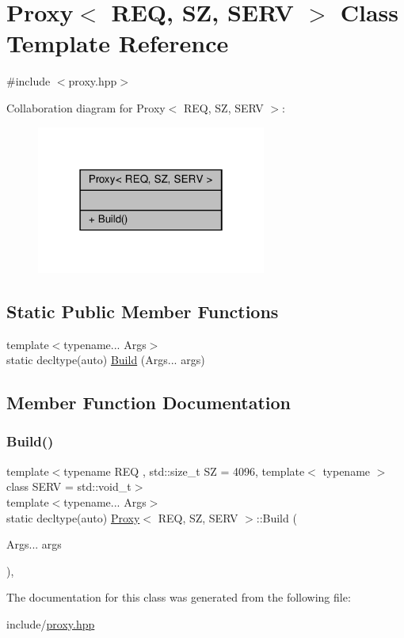 \hypertarget{classProxy}{}\section{Proxy$<$ R\+EQ, SZ, S\+E\+RV $>$ Class Template Reference}
\label{classProxy}


{\ttfamily \#include $<$proxy.\+hpp$>$}



Collaboration diagram for Proxy$<$ R\+EQ, SZ, S\+E\+RV $>$\+:
\nopagebreak
\begin{figure}[H]
\begin{center}
\leavevmode
\includegraphics[width=214pt]{classProxy__coll__graph}
\end{center}
\end{figure}
\subsection*{Static Public Member Functions}
\begin{DoxyCompactItemize}
\item 
{\footnotesize template$<$typename... Args$>$ }\\static decltype(auto) \hyperlink{classProxy_a06fe8fe4b6011f5bb4efbe3d7552939a}{Build} (Args... args)
\end{DoxyCompactItemize}


\subsection{Member Function Documentation}
\mbox{\label{classProxy_a06fe8fe4b6011f5bb4efbe3d7552939a}} 
\subsubsection{\texorpdfstring{Build()}{Build()}}
{\footnotesize\ttfamily template$<$typename R\+EQ , std\+::size\+\_\+t SZ = 4096, template$<$ typename $>$ class S\+E\+RV = std\+::void\+\_\+t$>$ \\
template$<$typename... Args$>$ \\
static decltype(auto) \hyperlink{classProxy}{Proxy}$<$ R\+EQ, SZ, S\+E\+RV $>$\+::Build (\begin{DoxyParamCaption}\item[{Args...}]{args }\end{DoxyParamCaption})\hspace{0.3cm}{\ttfamily [inline]}, {\ttfamily [static]}}



The documentation for this class was generated from the following file\+:\begin{DoxyCompactItemize}
\item 
include/\hyperlink{proxy_8hpp}{proxy.\+hpp}\end{DoxyCompactItemize}
